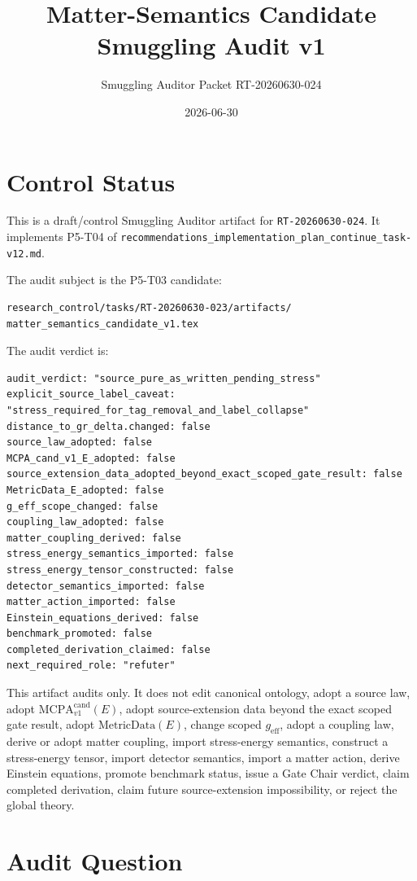 \documentclass[11pt]{article}
\title{Matter-Semantics Candidate Smuggling Audit v1}
\author{Smuggling Auditor Packet RT-20260630-024}
\date{2026-06-30}
\newcommand{\MetricData}{\mathrm{MetricData}}
\newcommand{\geff}{g_{\mathrm{eff}}}
\newcommand{\MCPA}{\mathrm{MCPA}^{\mathrm{cand}}_{v1}}
\begin{document}
\maketitle

\section{Control Status}

This is a draft/control Smuggling Auditor artifact for
\texttt{RT-20260630-024}. It implements P5-T04 of
\texttt{recommendations\_implementation\_plan\_continue\_task-v12.md}.

The audit subject is the P5-T03 candidate:
\begin{verbatim}
research_control/tasks/RT-20260630-023/artifacts/
matter_semantics_candidate_v1.tex
\end{verbatim}

The audit verdict is:
\begin{verbatim}
audit_verdict: "source_pure_as_written_pending_stress"
explicit_source_label_caveat: "stress_required_for_tag_removal_and_label_collapse"
distance_to_gr_delta.changed: false
source_law_adopted: false
MCPA_cand_v1_E_adopted: false
source_extension_data_adopted_beyond_exact_scoped_gate_result: false
MetricData_E_adopted: false
g_eff_scope_changed: false
coupling_law_adopted: false
matter_coupling_derived: false
stress_energy_semantics_imported: false
stress_energy_tensor_constructed: false
detector_semantics_imported: false
matter_action_imported: false
Einstein_equations_derived: false
benchmark_promoted: false
completed_derivation_claimed: false
next_required_role: "refuter"
\end{verbatim}

This artifact audits only. It does not edit canonical ontology, adopt a source
law, adopt \(\MCPA(E)\), adopt source-extension data beyond the exact scoped
gate result, adopt \(\MetricData(E)\), change scoped \(\geff\), adopt a
coupling law, derive or adopt matter coupling, import stress-energy semantics,
construct a stress-energy tensor, import detector semantics, import a matter
action, derive Einstein equations, promote benchmark status, issue a Gate
Chair verdict, claim completed derivation, claim future source-extension
impossibility, or reject the global theory.

\section{Audit Question}
\end{document}
